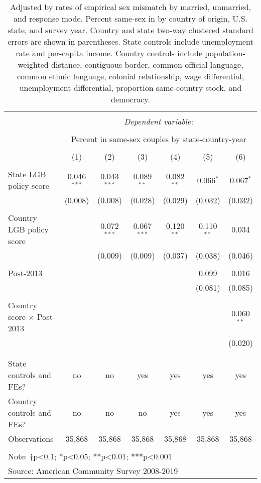\documentclass[
  11pt,
]{article}
\begin{document}
\begin{table}[!htbp] \centering 
  \caption{Adjusted by rates of empirical sex mismatch by married, unmarried, and response mode. Percent same-sex in by country of origin, U.S. state, and survey year. Country and state two-way clustered standard errors are shown in parentheses. State controls include unemployment rate and per-capita income. Country controls include population-weighted distance, contiguous border, common official language, common ethnic language, colonial relationship, wage differential, unemployment differential, proportion same-country stock, and democracy.} 
  \label{tab:state-props} 
\begin{tabular}{@{\extracolsep{5pt}}lcccccc} 
\\[-1.8ex]\hline 
\hline \\[-1.8ex] 
 & \multicolumn{6}{c}{\textit{Dependent variable:}} \\ 
\cline{2-7} 
\\[-1.8ex] & \multicolumn{6}{c}{Percent in same-sex couples by state-country-year} \\ 
\\[-1.8ex] & (1) & (2) & (3) & (4) & (5) & (6)\\ 
\hline \\[-1.8ex] 
 State LGB policy score & 0.046$^{***}$ & 0.043$^{***}$ & 0.089$^{**}$ & 0.082$^{**}$ & 0.066$^{*}$ & 0.067$^{*}$ \\ 
  & (0.008) & (0.008) & (0.028) & (0.029) & (0.032) & (0.032) \\ 
  & & & & & & \\ 
 Country LGB policy score &  & 0.072$^{***}$ & 0.067$^{***}$ & 0.120$^{**}$ & 0.110$^{**}$ & 0.034 \\ 
  &  & (0.009) & (0.009) & (0.037) & (0.038) & (0.046) \\ 
  & & & & & & \\ 
 Post-2013 &  &  &  &  & 0.099 & 0.016 \\ 
  &  &  &  &  & (0.081) & (0.085) \\ 
  & & & & & & \\ 
 Country score × Post-2013 &  &  &  &  &  & 0.060$^{**}$ \\ 
  &  &  &  &  &  & (0.020) \\ 
  & & & & & & \\ 
\hline \\[-1.8ex] 
State controls and FEs? & no & no & yes & yes & yes & yes \\ 
Country controls and FEs? & no & no & no & yes & yes & yes \\ 
Observations & 35,868 & 35,868 & 35,868 & 35,868 & 35,868 & 35,868 \\ 
\hline 
\hline \\[-1.8ex] 
\multicolumn{7}{l}{Note: †p<0.1; *p<0.05; **p<0.01; ***p<0.001} \\ 
\multicolumn{7}{l}{Source: American Community Survey 2008-2019} \\ 
\end{tabular} 
\end{table}
\end{document}
